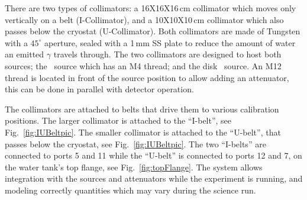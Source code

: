 \begin{figure}
\begin{minipage}[c]{0.4\textwidth}
    \end{minipage} 
    \label{fig:Colimator}
\end{figure}

There are two types of collimators: a 16X16X16\,cm collimator which moves only vertically on a belt (I-Collimator), and a 10X10X10\,cm collimator which also passes below the cryostat (U-Collimator). 
Both collimators are made of Tungsten with a $45^{\circ}$ aperture, sealed with a 1\,mm SS plate to reduce the amount of water an emitted $\gamma$ travels through. 
The two collimators are designed to host both sources; the \Th\ source which has an M4 thread; and the disk \Cs\ source. An M12 thread is located in front of the source position to allow adding an attenuator, this can be done in parallel with detector operation.
 
The collimators are attached to belts that drive them to various calibration positions. The larger collimator is attached to the ``I-belt'', see Fig.~\ref{fig:IUBeltpic}. The smaller collimator is attached to the ``U-belt'', that passes below the cryostat, see Fig.~\ref{fig:IUBeltpic}. The two ``I-belts'' are connected to ports 5 and 11 while the ``U-belt'' is connected to ports 12 and 7, on the water tank's top flange, see Fig.~\ref{fig:topFlange}. The system allows integration with the sources and attenuators while the experiment is running, and modeling correctly quantities which may vary during the science run. 


